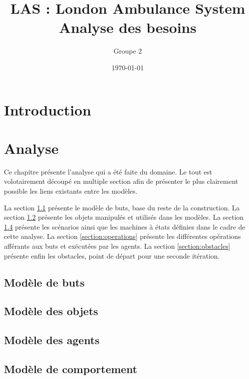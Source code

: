 \documentclass{report}
\title{LAS : London Ambulance System\\ \Large{Analyse des besoins}}
\author{Groupe 2}
\date{\today}
\begin{document}
\setlength{\parskip}{1em}

\maketitle
\tableofcontents

\chapter*{Introduction}
	
	
\chapter{Analyse}
	Ce chapitre présente l'analyse qui a été faite du domaine. Le tout est 
	volotairement découpé en multiple section afin de présenter le plus 
	clairement possible les liens existants entre les modèles. 
	
	La section \ref{section:buts} présente le modèle de buts, base du reste de 
	la construction.
	La section \ref{section:objets} présente les objets manipulés et utilisés 
	dans les modèles. La section \ref{section:comportement} présente
	les scénarios ainsi que les machines à états définies dans le cadre de
	cette analyse. 
	La section \ref{section:operations} présente les différentes opérations 
	afférants aux buts et exécutées par les agents.
	La section \ref{section:obstacles} présente enfin les obstacles, point
	de départ pour une seconde itération.
		
	\section{Modèle de buts}\label{section:buts}
		
		
	\section{Modèle des objets}\label{section:objets}
		

	\section{Modèle des agents}\label{section:agents}
		
		
	\section{Modèle de comportement}\label{section:comportement}
		
\end{document}
